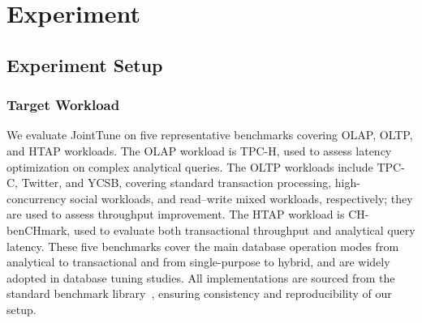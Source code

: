 \documentclass[runningheads]{llncs}
\begin{document}
%
%
%
%
%
\section{Experiment}\label{sec:experiment}

\subsection{Experiment Setup}\label{sec:setup}

\subsubsection{Target Workload}\label{sec:workload}

We evaluate JointTune on five representative benchmarks covering OLAP,
OLTP, and HTAP workloads. The OLAP workload is TPC-H, used to assess
latency optimization on complex analytical queries. The OLTP workloads
include TPC-C, Twitter, and YCSB, covering standard transaction
processing, high-concurrency social workloads, and read--write mixed
workloads, respectively; they are used to assess throughput improvement.
The HTAP workload is CH-benCHmark, used to evaluate both transactional
throughput and analytical query latency. These five benchmarks cover the
main database operation modes from analytical to transactional and from
single-purpose to hybrid, and are widely adopted in database tuning
studies. All implementations are sourced from the standard benchmark
library~\cite{difallah2013oltpbench,leis2015job}, ensuring consistency and reproducibility
of our setup.
\end{document}

